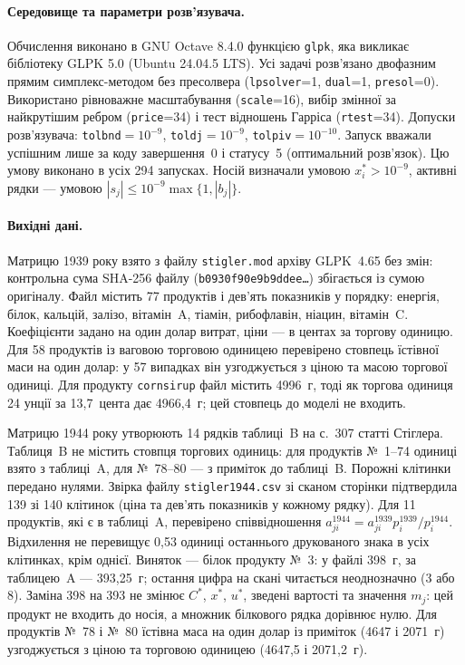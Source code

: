 
\paragraph{Середовище та параметри розв’язувача.}
Обчислення виконано в GNU Octave 8.4.0 функцією \texttt{glpk}, яка викликає бібліотеку GLPK 5.0 (Ubuntu 24.04.5 LTS). Усі задачі розв’язано двофазним прямим симплекс-методом без пресолвера (\texttt{lpsolver}=1, \texttt{dual}=1, \texttt{presol}=0). Використано рівноважне масштабування (\texttt{scale}=16), вибір змінної за найкрутішим ребром (\texttt{price}=34) і тест відношень Гарріса (\texttt{rtest}=34). Допуски розв’язувача: \texttt{tolbnd}$=10^{-9}$, \texttt{toldj}$=10^{-9}$, \texttt{tolpiv}$=10^{-10}$. Запуск вважали успішним лише за коду завершення~0 і статусу~5 (оптимальний розв’язок). Цю умову виконано в усіх 294 запусках. Носій визначали умовою $x_i^*>10^{-9}$, активні рядки --- умовою $|s_j|\le10^{-9}\max\{1,|b_j|\}$.

\paragraph{Вихідні дані.}
Матрицю 1939 року взято з файлу \texttt{stigler.mod} архіву GLPK~4.65 без змін: контрольна сума SHA-256 файлу (\texttt{b0930f90e9b9ddee\ldots}) збігається із сумою оригіналу. Файл містить 77 продуктів і дев’ять показників у порядку: енергія, білок, кальцій, залізо, вітамін~A, тіамін, рибофлавін, ніацин, вітамін~C. Коефіцієнти задано на один долар витрат, ціни --- в центах за торгову одиницю. Для 58 продуктів із ваговою торговою одиницею перевірено стовпець їстівної маси на один долар: у 57 випадках він узгоджується з ціною та масою торгової одиниці. Для продукту \texttt{cornsirup} файл містить 4996~г, тоді як торгова одиниця 24 унції за 13{,}7~цента дає 4966{,}4~г; цей стовпець до моделі не входить. 

Матрицю 1944 року утворюють 14 рядків таблиці~B на с.~307 статті Стіглера. Таблиця~B не містить стовпця торгових одиниць: для продуктів №~1--74 одиниці взято з таблиці~A, для №~78--80 --- з приміток до таблиці~B. Порожні клітинки передано нулями. Звірка файлу \texttt{stigler1944.csv} зі сканом сторінки підтвердила 139 зі 140 клітинок (ціна та дев’ять показників у кожному рядку). Для 11 продуктів, які є в таблиці~A, перевірено співвідношення $a^{1944}_{ji}=a^{1939}_{ji}p^{1939}_i/p^{1944}_i$. Відхилення не перевищує 0{,}53 одиниці останнього друкованого знака в усіх клітинках, крім однієї. Виняток --- білок продукту №~3: у файлі 398~г, за таблицею~A --- 393{,}25~г; остання цифра на скані читається неоднозначно (3 або 8). Заміна 398 на 393 не змінює $C^*$, $x^*$, $u^*$, зведені вартості та значення $m_j$: цей продукт не входить до носія, а множник білкового рядка дорівнює нулю. Для продуктів №~78 і №~80 їстівна маса на один долар із приміток (4647 і 2071~г) узгоджується з ціною та торговою одиницею (4647{,}5 і 2071{,}2~г).

